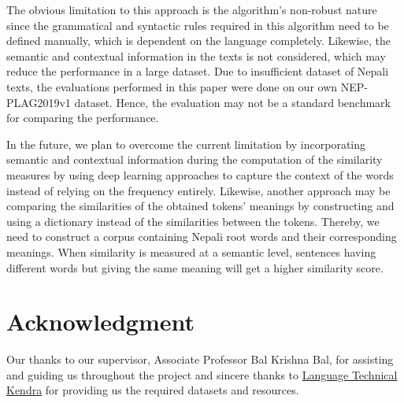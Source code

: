 \documentclass[conference]{IEEEtran}
\begin{document}
The obvious limitation to this approach is the algorithm's non-robust nature 
since the grammatical and syntactic rules required in this algorithm need to be
defined manually, which is dependent on the language completely. Likewise, the
semantic and contextual information in the texts is not considered, which may 
reduce the performance in a large dataset. Due
to insufficient dataset of Nepali texts, the evaluations performed in this 
paper were done on our own NEP-PLAG2019v1 dataset. Hence, the evaluation may 
not be a standard benchmark for comparing the performance.

In the future, we plan to overcome the current limitation by incorporating semantic
and contextual information during the computation of the similarity measures by
using deep learning approaches to capture the context of the words instead of
relying on the frequency entirely. Likewise, another approach may be 
comparing the similarities of the obtained
tokens' meanings by constructing and using a dictionary instead of the similarities
between the tokens. Thereby, we need to construct a corpus containing Nepali
root words and their corresponding meanings. When similarity is measured at a
semantic level, sentences having different words but giving the same meaning
will get a higher similarity score.

\section*{Acknowledgment}
Our thanks to our supervisor, Associate Professor Bal Krishna Bal,
for assisting and guiding us throughout the project and sincere thanks to 
\href{http://ltk.org.np/}{Language Technical Kendra} for providing us the
required datasets and resources.

 

\end{document}
